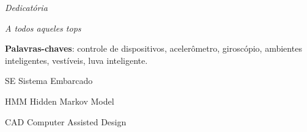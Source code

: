 \documentclass[
	12pt,				%
  oneside,
	a4paper,			%
	chapter=TITLE,		%
	english,			%
	brazil				%
	]{abntex2}
\begin{document}
\frenchspacing


\imprimircapa

\imprimirfolhaderosto

\imprimirfolhadeaprovacao
\begin{dedicatoria}
   \vspace*{\fill}
   \centering
   \noindent
   \textit{ Dedicatória }
   \vspace*{\fill}
\end{dedicatoria}

\begin{agradecimentos}


\end{agradecimentos}

\begin{epigrafe}
    \vspace*{\fill}
	\begin{flushright}
		\textit{A todos aqueles tops}
	\end{flushright}
\end{epigrafe}


\setlength{\absparsep}{18pt} %
\begin{resumo}
  \textbf{Palavras-chaves}: controle de dispositivos, acelerômetro, giroscópio, ambientes inteligentes, vestíveis, luva inteligente.
\end{resumo}

\listoffigures*
\cleardoublepage

\listoftables*
\cleardoublepage

\begin{siglas}
	\item[SE] Sistema Embarcado
    \item[HMM] Hidden Markov Model
    \item[CAD] Computer Assisted Design
\end{siglas}
\end{document}
